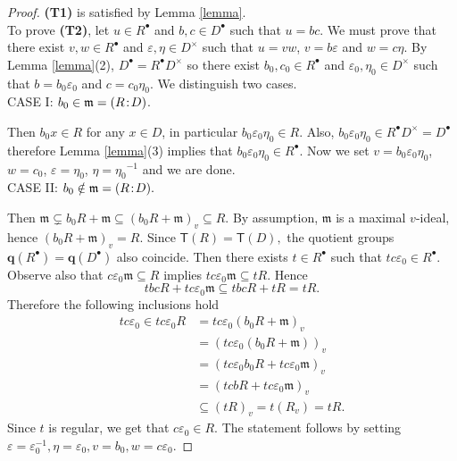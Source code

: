 \documentclass[10pt,a4paper]{amsart}
\newcommand{\DP}{\negthinspace : \negthinspace}
\renewcommand{\epsilon}{\varepsilon}
\begin{document}
 \begin{proof}
		\textbf{(T1)} is satisfied by Lemma \ref{lemma}.\\
		To prove \textbf{(T2)}, let $u \in R^{\bullet}$ and $b,c \in D^{\bullet}$ such that $u=bc$. We must prove that there exist $v, w \in R^{\bullet}$ and $\epsilon, \eta \in D^\times$ such that $u=vw$, $v=b\epsilon$ and $w=c\eta$. By Lemma \ref{lemma}(2), $D^{\bullet}=R^{\bullet}D^\times$ so there exist $b_0, c_0 \in R^{\bullet}$ and $\epsilon_0, \eta_0 \in  D^\times$ such that $b=b_0 \epsilon_0$ and $c=c_0 \eta_0$. We distinguish two cases.\\
		CASE I: $b_0 \in \mathfrak{m}=(R\DP D)$.
		
		Then $b_0 x \in R$ for any $x \in D$, in particular $b_0 \epsilon_0 \eta_0 \in R$. Also, $b_0 \epsilon_0 \eta_0 \in R^{\bullet}D^\times=D^{\bullet}$ therefore Lemma \ref{lemma}(3) implies that $b_0 \epsilon_0 \eta_0 \in R^{\bullet}$. Now we set $v=b_0 \epsilon_0 \eta_0$, $w=c_0$, $\epsilon= \eta_0$, $\eta={\eta_0}^{-1}$ and we are done.  \\
	CASE II: $b_0\notin \mathfrak{m}=(R\DP D).$

 Then $\mathfrak{m}\subsetneq b_0R+ \mathfrak{m}\subseteq (b_0R+\mathfrak{m})_v\subseteq R $. By assumption, $\mathfrak{m}$ is a maximal $v$-ideal, hence $(b_0R+\mathfrak{m})_v= R.$ Since $\mathsf{T}(R)=\mathsf T(D),$ the quotient groups $\mathbf{q}(R^\bullet)=\mathbf{q}(D^\bullet)$ also coincide. 
 Then there exists $t\in R^\bullet$ such that $tc\epsilon_0\in R^\bullet.$ Observe also that $c\epsilon_0\mathfrak{m}\subseteq R$ implies  $tc\epsilon_0\mathfrak{m} \subseteq tR.$ Hence $$tbcR+ tc\epsilon_0\mathfrak{m}\subseteq tbcR+ tR=tR.$$ Therefore the following inclusions hold
\begin{equation*}
    \begin{split}
        tc\epsilon_0\in tc\epsilon_0R &=tc\epsilon_0(b_0R+ \mathfrak{m})_v\\
        &= (tc\epsilon_0(b_0R+  \mathfrak{m}))_v\\
        &=(tc\epsilon_0b_0R+ tc\epsilon_0\mathfrak{m})_v\\
        &=(tcbR+ tc\epsilon_0\mathfrak{m})_v \\ 
        &\subseteq (tR)_v =t(R_v)=tR.
    \end{split}
\end{equation*}
Since $t$ is regular, we get that $c\epsilon_0\in R.$ The statement follows by setting $\epsilon=\epsilon_0^{-1},\eta=\epsilon_0, v= b_0,w=c\epsilon_0.$
	\end{proof}
\end{document}
